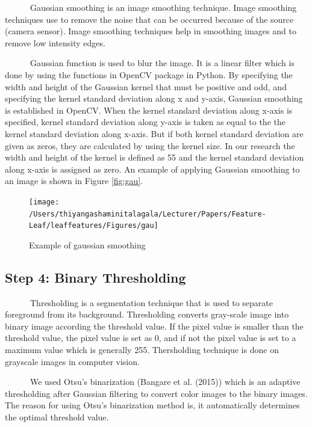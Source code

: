 \documentclass{article}
\begin{document}
~~~~~~Gaussian smoothing is an image smoothing technique. Image
smoothing techniques use to remove the noise that can be occurred
because of the source (camera sensor). Image smoothing techniques help
in smoothing images and to remove low intensity edges.

~~~~~~Gaussian function is used to blur the image. It is a linear filter
which is done by using the functions in OpenCV package in Python. By
specifying the width and height of the Gaussian kernel that must be
positive and odd, and specifying the kernel standard deviation along x
and y-axis, Gaussian smoothing is established in OpenCV. When the kernel
standard deviation along x-axis is specified, kernel standard deviation
along y-axis is taken as equal to the the kernel standard deviation
along x-axis. But if both kernel standard deviation are given as zeros,
they are calculated by using the kernel size. In our research the width
and height of the kernel is defined as 55 and the kernel standard
deviation along x-axis is assigned as zero. An example of applying
Gaussian smoothing to an image is shown in Figure \ref{fig:gau}.

\begin{figure}[!ht]

{\centering \texttt{[image: /Users/thiyangashaminitalagala/Lecturer/Papers/Feature-Leaf/leaffeatures/Figures/gau]} 

}

\caption{\label{fig:gau}Example of gaussian smoothing}\label{fig:unnamed-chunk-3}
\end{figure}

\hypertarget{step-4-binary-thresholding}{%
\subsection{Step 4: Binary
Thresholding}\label{step-4-binary-thresholding}}

~~~~~~Thresholding is a segmentation technique that is used to separate
foreground from its background. Thresholding converts gray-scale image
into binary image according the threshold value. If the pixel value is
smaller than the threshold value, the pixel value is set as 0, and if
not the pixel value is set to a maximum value which is generally 255.
Thersholding technique is done on grayscale images in computer vision.

~~~~~~We used Otsu's binarization (Bangare et al. (2015)) which is an
adaptive thresholding after Gaussian filtering to convert color images
to the binary images. The reason for using Otsu's binarization method
is, it automatically determines the optimal threshold value.
\end{document}
